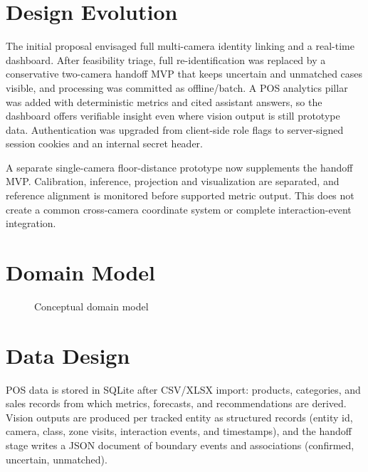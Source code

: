 \section{Design Evolution}
The initial proposal envisaged full multi-camera identity linking and a real-time dashboard. After feasibility triage, full re-identification was replaced by a conservative two-camera handoff MVP that keeps uncertain and unmatched cases visible, and processing was committed as offline/batch. A POS analytics pillar was added with deterministic metrics and cited assistant answers, so the dashboard offers verifiable insight even where vision output is still prototype data. Authentication was upgraded from client-side role flags to server-signed session cookies and an internal secret header.

A separate single-camera floor-distance prototype now supplements the handoff MVP. Calibration, inference, projection and visualization are separated, and reference alignment is monitored before supported metric output. This does not create a common cross-camera coordinate system or complete interaction-event integration.

\section{Domain Model}
\begin{figure}[H]
\centering
{}
\caption{Conceptual domain model}
\end{figure}

\section{Data Design}
POS data is stored in SQLite after CSV/XLSX import: products, categories, and sales records from which metrics, forecasts, and recommendations are derived. Vision outputs are produced per tracked entity as structured records (entity id, camera, class, zone visits, interaction events, and timestamps), and the handoff stage writes a JSON document of boundary events and associations (confirmed, uncertain, unmatched). 


